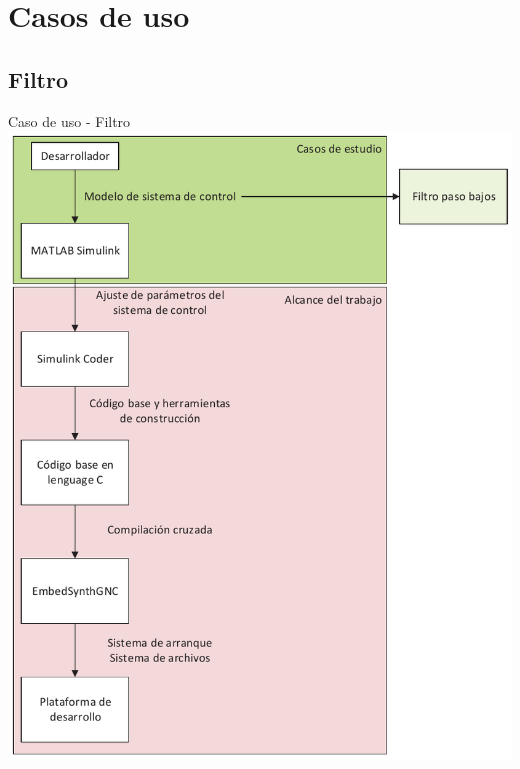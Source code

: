 \documentclass[10pt,aspectratio=169]{beamer} %
\begin{document}
\section{Casos de uso}

\subsection{Filtro}

\begin{frame}{Caso de uso - Filtro}
  \centering
  \includegraphics[scale=0.4]{Diagrama_general_del_proyecto/dgp_ce_2.pdf}
\end{frame}
\end{document}
